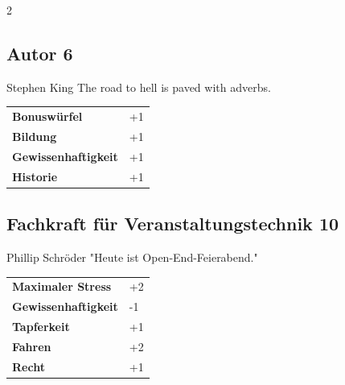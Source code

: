 \begin{multicols}{2}
\begin{tcolorbox}
    \subsection*{Autor \hfill \small{6 }}
    \tcblower


\begin{pquote}{Stephen King}
The road to hell is paved with adverbs.
\end{pquote}

\vspace{3mm}

\begin{tabular}{@{}ll@{}}
    \textbf{Bonuswürfel} & +1\\
    \textbf{Bildung} & +1\\
    \textbf{Gewissenhaftigkeit} & +1\\
    \textbf{Historie} & +1\\
\end{tabular}


\end{tcolorbox}

\begin{tcolorbox}
    \subsection*{Fachkraft für Veranstaltungstechnik \hfill \small{10 }}
    \tcblower


\begin{pquote}{Phillip Schröder}
"Heute ist Open-End-Feierabend."
\end{pquote}

\vspace{3mm}

\begin{tabular}{@{}ll@{}}
    \textbf{Maximaler Stress} & +2\\
    \textbf{Gewissenhaftigkeit} & -1\\
    \textbf{Tapferkeit} & +1\\
    \textbf{Fahren} & +2\\
    \textbf{Recht} & +1\\
\end{tabular}


\end{tcolorbox}
\end{multicols}
